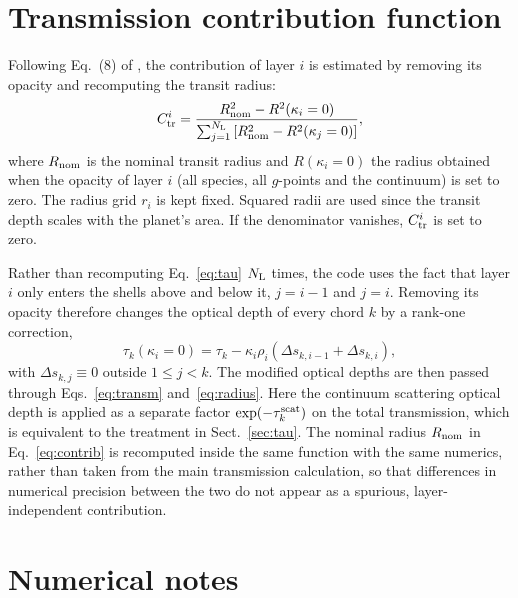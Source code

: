 \documentclass[11pt,a4paper]{article}
\newcommand{\Rnom}{R_{\rm nom}}
\newcommand{\Ntot}{N_{\rm L}}
\begin{document}
\section{Transmission contribution function}
\label{sec:contribution}

Following Eq.~(8) of \citet{molliere2019}, the contribution of layer $i$ is
estimated by removing its opacity and recomputing the transit radius:
\begin{equation}
  C_{\rm tr}^{i} =
  \frac{\Rnom^2 - R^2(\kappa_i = 0)}
       {\sum_{j=1}^{\Ntot}\left[\Rnom^2 - R^2(\kappa_j = 0)\right]} ,
  \label{eq:contrib}
\end{equation}
where $\Rnom$ is the nominal transit radius and $R(\kappa_i=0)$ the radius
obtained when the opacity of layer $i$ (all species, all $g$-points and the
continuum) is set to zero. The radius grid $r_i$ is kept fixed. Squared
radii are used since the transit depth scales with the planet's area. If
the denominator vanishes, $C_{\rm tr}^i$ is set to zero.

Rather than recomputing Eq.~\eqref{eq:tau} $\Ntot$ times, the code uses the
fact that layer $i$ only enters the shells above and below it, $j = i-1$
and $j = i$. Removing its opacity therefore changes the optical depth of
every chord $k$ by a rank-one correction,
\begin{equation}
  \tau_k(\kappa_i = 0) = \tau_k
  - \kappa_i\rho_i\left(\Delta s_{k,i-1} + \Delta s_{k,i}\right),
  \label{eq:tau_loo}
\end{equation}
with $\Delta s_{k,j} \equiv 0$ outside $1 \le j < k$. The modified optical
depths are then passed through Eqs.~\eqref{eq:transm}
and~\eqref{eq:radius}. Here the continuum scattering optical depth is
applied as a separate factor $\exp(-\tau^{\rm scat}_k)$ on the total
transmission, which is equivalent to the treatment in
Sect.~\ref{sec:tau}. The nominal radius $\Rnom$ in Eq.~\eqref{eq:contrib} is
recomputed inside the same function with the same numerics, rather than
taken from the main transmission calculation, so that differences in
numerical precision between the two do not appear as a spurious,
layer-independent contribution.

\section{Numerical notes}
\end{document}
